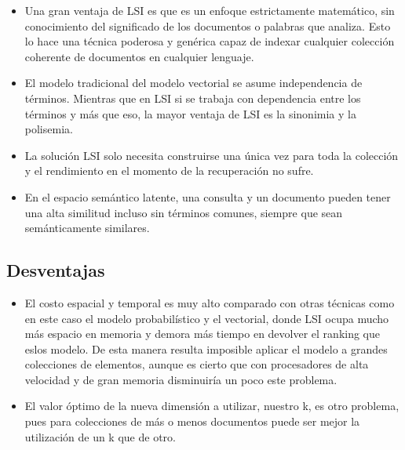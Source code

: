 \documentclass[spanish]{article}
\begin{document}
\begin{itemize}
 \item Una gran ventaja de LSI es que es un enfoque estrictamente matemático, sin conocimiento del significado de los documentos o palabras que analiza. Esto lo hace una técnica poderosa y genérica capaz de indexar cualquier colección coherente de documentos en cualquier lenguaje. 

\item  El modelo tradicional del modelo vectorial se asume independencia de términos. Mientras que en LSI si se trabaja con dependencia entre los términos y más que eso, la mayor ventaja de LSI es la sinonimia y la polisemia.

\item La solución LSI solo necesita construirse una única vez para toda la colección y el rendimiento en el momento de la recuperación no sufre. 

\item En el espacio semántico latente, una consulta y un documento pueden tener una alta similitud incluso sin términos comunes, siempre que sean semánticamente similares.


\end{itemize}

\subsection*{Desventajas}

\begin{itemize}
 \item El costo espacial y temporal es muy alto comparado con otras técnicas como en este caso el modelo probabilístico y el vectorial, donde LSI ocupa mucho más espacio en memoria y demora más tiempo en devolver el ranking que eslos modelo. De esta manera resulta imposible aplicar el modelo a grandes colecciones de elementos, aunque es cierto que con procesadores de alta velocidad y de gran memoria disminuiría un poco este problema.
 
\item El valor óptimo de la nueva dimensión a utilizar, nuestro k, es otro problema, pues para colecciones de más o menos documentos puede ser mejor la utilización de un k que de otro.
 
\end{itemize}
\end{document}
